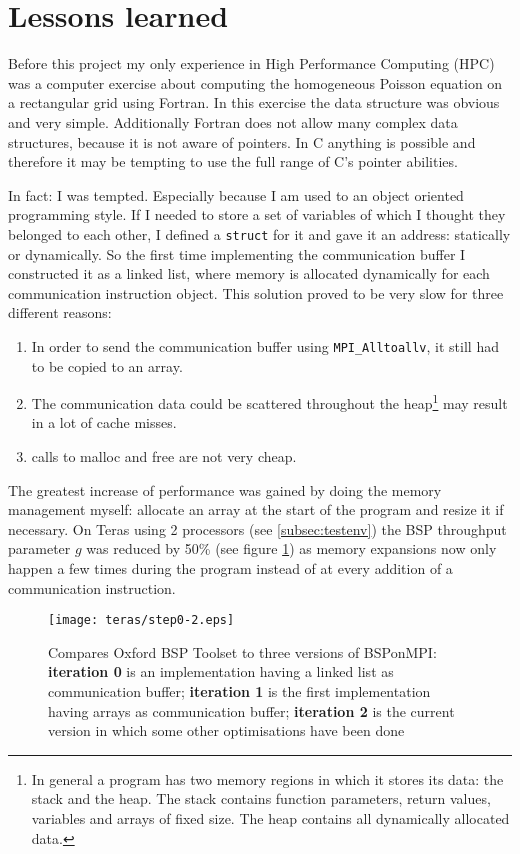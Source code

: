 \documentclass[a4paper]{article}
\begin{document}
\section{Lessons learned}
Before this project my only experience in High Performance Computing (HPC) was
a computer exercise about computing the homogeneous Poisson equation on a
rectangular grid using Fortran. In this exercise the data structure was
obvious and very simple. Additionally Fortran does not allow many complex data
structures, because it is not aware of pointers. In C anything is possible and
therefore it may be tempting to use the full range of C's pointer abilities.

In fact: I was tempted. Especially because I am used to an object oriented
programming style. If I needed to store a set of variables of which I thought
they belonged to each other, I defined a \verb|struct| for it and gave it an
address: statically or dynamically.  So the first time implementing the
communication buffer I constructed it as a linked list, where memory is
allocated dynamically for each communication instruction object. This solution
proved to be very slow for three different reasons:
\begin{enumerate}
\item In order to send the communication buffer using \verb|MPI_Alltoallv|, it
still had to be copied to an array.
\item The communication data could be scattered throughout the
heap\footnote{In general a program has two memory regions in which it stores
its data: the stack and the heap. The stack contains function parameters,
return values, variables and arrays of fixed size. The heap contains all
dynamically allocated data.} may result in a lot of cache misses. 
\item calls to malloc and free are not very cheap.
\end{enumerate}

The greatest increase of performance was gained by doing the memory management
myself: allocate an array at the start of the program and resize it if
necessary. On Teras using 2 processors (see \ref{subsec:testenv}) the BSP
throughput parameter $g$ was reduced by 50\% (see figure \ref{fig:step0-2}) as
memory expansions now only happen a few times during the program instead of
at every addition of a communication instruction. 

\begin{figure}[htbp]
\texttt{[image: teras/step0-2.eps]}
\caption{Compares Oxford BSP Toolset to three versions of BSPonMPI:
\textbf{iteration 0} is an implementation having a linked list as communication
buffer;
\textbf{iteration 1} is the first implementation having arrays as communication
buffer;
\textbf{iteration 2} is the current version in which some other optimisations
have been done
}
\label{fig:step0-2}
\end{figure}
\end{document}
